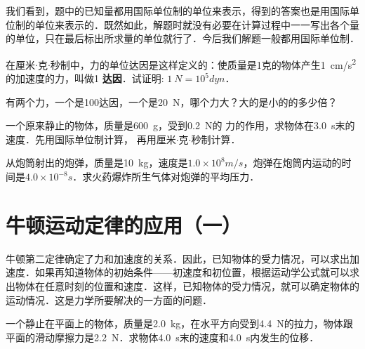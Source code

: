 \begin{Test}
我们看到，题中的已知量都用国际单位制的单位来表示，得到的答案也是用国际单位制的单位来表示的．既然如此，解题时就没有必要在计算过程中一一写出各个量的单位，只在最后标出所求量的单位就行了．今后我们解题一般都用国际单位制．




\begin{Exercise}
	\begin{QsNum}
		\item 在厘米$\cdot$克$\cdot$秒制中，力的单位达因是这样定义的：使质量是1克的物体产生\SI{1}{cm/s^2}的加速度的力，叫做1\textbf{ 达因}．试证明: $\SI{1}{N}={10^5}\si{dyn}$．
		\item 有两个力，一个是100达因，一个是\SI{20}{N}，哪个力大？大的是小的的多少倍？
		\item 一个原来静止的物体，质量是\SI{600}{g}，受到\SI{0.2}{N}的
		力的作用，求物体在\SI{3.0}{s}末的速度．先用国际单位制计算，
		再用厘米$\cdot$克$\cdot$秒制计算．
		\item 从炮筒射出的炮弹，质量是\SI{10}{kg}，速度是$1.0\times 10^8\si{m/s}$，炮弹在炮筒内运动的时间是$4.0\times 10^{-8}\si{s}$．求火药爆炸所生气体对炮弹的平均压力．
	\end{QsNum}
\end{Exercise}




\section{牛顿运动定律的应用（一）}

牛顿第二定律确定了力和加速度的关系．因此，已知物体的受力情况，可以求出加速度．如果再知道物体的初始条件——初速度和初位置，根据运动学公式就可以求出物体在任意时刻的位置和速度．这样，已知物体的受力情况，就可以确定物体的运动情况．这是力学所要解决的一方面的问题．

\begin{Example}
    一个静止在平面上的物体，质量是\SI{2.0}{kg}，在水平方向受到\SI{4.4}{N}的拉力，物体跟平面的滑动摩擦力是\SI{2.2}{N}．求物体\SI{4.0}{s}末的速度和\SI{4.0}{s}内发生的位移．
\end{Example}

\begin{figure}[H]\centering
    \caption{}
\end{figure}


\end{Test}
